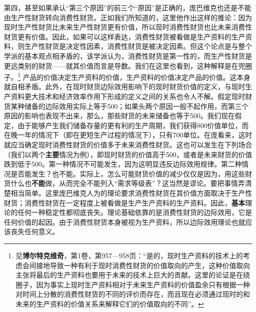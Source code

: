 \documentclass[fontset=fandol, a4paper, 12pt, openright]{ctexbook}
\begin{document}
第四，甚至如果承认“第三个原因”的前三个“原因”是正确的，庞巴维克也还是不能由生产性财货转向消费性财货。正如我们所知道的，这里他作出这样的推论：因为现时生产性财货比未来生产性财货更有价值，所以现时消费性财货也比未来消费性财货更有价值。因此，如果可以这样表达，消费性财货被看做是生产资料的生产资料，则生产性财货是决定性因素，消费性财货是被决定因素。但这个论点是与整个学派的基本观点相矛盾的，该学派认为，消费性财货是第一性的，而生产性财货是更远类别的财货——就其价值而言是导数。我们在这里也看到，这种解释是在兜圈子。\footnote{见\textbf{博尔特克维奇}，第1卷，第957—958页：“是的，现时生产资料的技术上的考虑会间接地导致一种有利于现时消费性财货的价值取向的产生，这种价值取向主张将最后的生产资料也要用于未来的技术上巨大的贡献。这里的论证是在绕圈子，因为事实上现时生产资料相对于未来生产资料的价值盈余只有根据一种对时间上分散的消费性财货的不同的评价而存在，而且现在必须通过现时的和未来的生产资料的价值关系来解释它们的价值取向的不同”。} 产品的价值决定生产资料的价值，生产资料的价值决定产品的价值。这本身就自相矛盾。此外，在现时财货边际效用影响下的现时财货价值的定义，与现时生产资料更大技术和经济效率作用下形成的定义之间的关系也令人不解。假定现时财货某种储备的边际效用实际上等于500；如果头两个原因一般不起作用，而第三个原因的影响也表现不出来，那么，那些财货的未来储备也等于500。我们现在假定，由于能够产生我们储备存量的更有利的生产周期，我们获得800价值单位，而在晚一年的情况下（即在更短生产过程的情况下），只有700单位。在庞看来，这时就应当确定现时消费性财货的价值多于未来消费性财货。这也可以发生在下列场合（我们以两个\textbf{主要}情况为例），即现时财货的价值高于500，或者是未来财货的价值跌到低于500。第一种情况不可能发生，因为这明显违反边际效用规律。第二种情况是否能发生？也不能。实际上，怎么可能财货价值的减少仅仅是因为，用这些财货什么也\textbf{不能}做，从而完全不能列入“需求等级表”？这当然是谬论。要把事情弄清楚相当简单。这里庞巴维克人为的理论要求消费性财货在其价值方面取决于生产性财货；消费性财货在一定程度上被看做是生产生产资料的生产资料。因此，\textbf{基本}理论的任何一种稳定性都彻底丧失。理论基础依靠的是消费性财货的边际效用，它是任何价值的起因。由于消费性财货本身被视为生产资料，所以边际效用理论也就应该丧失任何意义。
\end{document}
